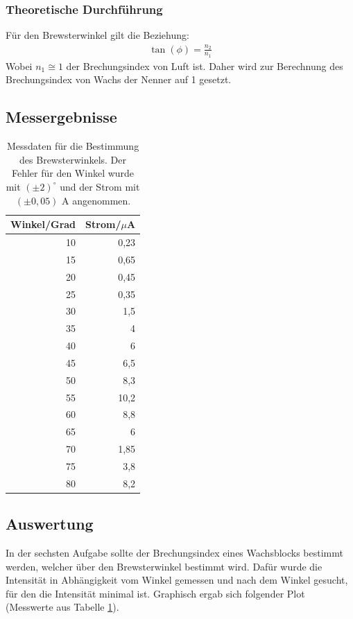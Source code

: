 \documentclass[12pt]{scrartcl}
\begin{document}
\subsubsection{Theoretische Durchführung}
Für den Brewsterwinkel gilt die Beziehung:
\begin{align}
\tan(\phi) = \frac{n_2}{n_1}
\label{eqn: Brewsterwinkel}
\end{align}
Wobei $n_1 \cong 1$ der Brechungsindex von Luft ist. Daher wird zur Berechnung des Brechungsindex von Wachs der Nenner auf 1 gesetzt.
\subsection{Messergebnisse}
\begin{table}[H]
\caption{Messdaten für die Bestimmung des Brewsterwinkels. Der Fehler für den Winkel wurde mit $(\pm 2)^{\circ}$ und der Strom mit $(\pm 0,05)$ A angenommen.}
\centering
\begin{tabular}{|r|r|}
\hline
\multicolumn{1}{|l|}{Winkel/Grad} & \multicolumn{1}{l|}{Strom/$\mu$A} \\ \hline
10 & 0,23 \\ \hline
15 & 0,65 \\ \hline
20 & 0,45 \\ \hline
25 & 0,35 \\ \hline
30 & 1,5 \\ \hline
35 & 4 \\ \hline
40 & 6 \\ \hline
45 & 6,5 \\ \hline
50 & 8,3 \\ \hline
55 & 10,2 \\ \hline
60 & 8,8 \\ \hline
65 & 6 \\ \hline
70 & 1,85 \\ \hline
75 & 3,8 \\ \hline
80 & 8,2 \\ \hline
\end{tabular}
\label{tab:a_6}
\end{table}
\subsection{Auswertung}
In der sechsten Aufgabe sollte der Brechungsindex eines Wachsblocks bestimmt werden, welcher über den Brewsterwinkel bestimmt wird. Dafür wurde die Intensität in Abhängigkeit vom Winkel gemessen und nach dem Winkel gesucht, für den die Intensität minimal ist. Graphisch ergab sich folgender Plot (Messwerte aus Tabelle \ref{tab:a_6}).
\end{document}

